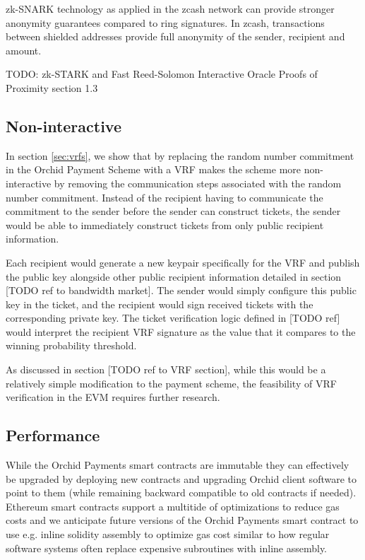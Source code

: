 zk-SNARK\cite{zkSNARKs} technology as applied in the zcash network \cite{zcash-zksnarks} can provide stronger anonymity guarantees compared to ring signatures. In zcash, transactions between shielded addresses provide full anonymity of the sender, recipient and amount.

TODO: zk-STARK and Fast Reed-Solomon Interactive Oracle Proofs of Proximity section 1.3

\subsection{Non-interactive}

In section \ref{sec:vrfs}, we show that by replacing the random number commitment in the Orchid Payment Scheme with a VRF makes the scheme more non-interactive by removing the communication steps associated with the random number commitment. Instead of the recipient having to communicate the commitment to the sender before the sender can construct tickets, the sender would be able to immediately construct tickets from only public recipient information.

Each recipient would generate a new keypair specifically for the VRF and publish the public key alongside other public recipient information detailed in section [TODO ref to bandwidth market]. The sender would simply configure this public key in the ticket, and the recipient would sign received tickets with the corresponding private key. The ticket verification logic defined in [TODO ref] would interpret the recipient VRF signature as the value that it compares to the winning probability threshold.

As discussed in section [TODO ref to VRF section], while this would be a relatively simple modification to the payment scheme, the feasibility of VRF verification in the EVM requires further research.

\subsection{Performance}

While the Orchid Payments smart contracts are immutable they can effectively be upgraded by deploying new contracts and upgrading Orchid client software to point to them (while remaining backward compatible to old contracts if needed). Ethereum smart contracts support a multitide of optimizations to reduce gas costs and we anticipate future versions of the Orchid Payments smart contract to use e.g. inline solidity assembly \cite{SolidityAssembly} to optimize gas cost similar to how regular software systems often replace expensive subroutines with inline assembly.

